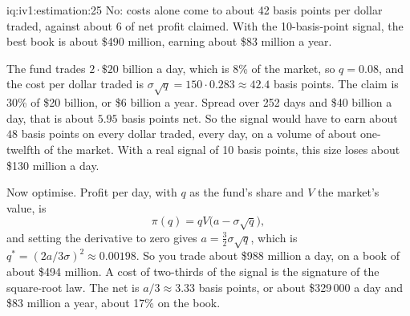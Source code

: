 \begin{solution}{iq:iv1:estimation:25}
No: costs alone come to about 42 basis points per dollar traded, against about 6 of net profit claimed. With the 10-basis-point signal, the best book is about \$490 million, earning about \$83 million a year.

The fund trades $2 \cdot \$20$ billion a day, which is 8\% of the market, so $q = 0.08$, and the cost per dollar traded is $\sigma\sqrt{q} = 150 \cdot 0.283 \approx 42.4$ basis points. The claim is 30\% of \$20 billion, or \$6 billion a year. Spread over 252 days and \$40 billion a day, that is about $5.95$ basis points net. So the signal would have to earn about $48$ basis points on every dollar traded, every day, on a volume of about one-twelfth of the market. With a real signal of 10 basis points, this size loses about \$130 million a day.

Now optimise. Profit per day, with $q$ as the fund's share and $V$ the market's value, is
\[
\pi(q) = qV\bigl(a - \sigma\sqrt{q}\bigr),
\]
and setting the derivative to zero gives $a = \tfrac32\sigma\sqrt{q}$, which is $q^* = (2a/3\sigma)^2 \approx 0.00198$. So you trade about \$988 million a day, on a book of about \$494 million. A cost of two-thirds of the signal is the signature of the square-root law. The net is $a/3 \approx 3.33$ basis points, or about \$329\,000 a day and \$83 million a year, about 17\% on the book.

\end{solution}
